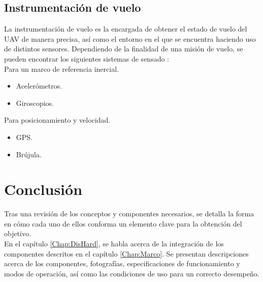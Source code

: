 \subsection{Instrumentación de vuelo}

La instrumentación de vuelo es la encargada de obtener el estado de vuelo del UAV de manera precisa, así como el entorno en el que se encuentra haciendo uso de distintos sensores. Dependiendo de la finalidad de una misión de vuelo, se pueden encontrar los siguientes sistemas de sensado \citep{barrientos2007vehiculos}:\\

Para un marco de referencia inercial.
\begin{itemize}
\item Acelerómetros.
\item Giroscopios.
\end{itemize} 

Para posicionamiento y velocidad.

\begin{itemize}
\item GPS.
\item Brújula.
\end{itemize}

\section{Conclusión}

Tras una revisión de los conceptos y componentes necesarios, se detalla la forma en cómo cada uno de ellos conforma un elemento clave para la obtención del objetivo.\\

En el capítulo \ref{Chap:DisHard}, se habla acerca de la integración de los componentes descritos en el capítulo \ref{Chap:Marco}. Se presentan descripciones acerca de los componentes, fotografías, especificaciones de funcionamiento y modos de operación, así como las condiciones de uso para un correcto desempeño. 
